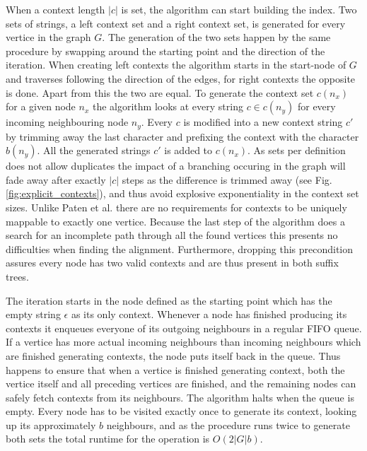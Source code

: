 \documentclass{article}
\begin{document}
When a context length $|c|$ is set, the algorithm can start building the index. Two sets of strings, a left context set and a right context set, is generated for every vertice in the graph $G$. The generation of the two sets happen by the same procedure by swapping around the starting point and the direction of the iteration. When creating left contexts the algorithm starts in the start-node of $G$ and traverses following the direction of the edges, for right contexts the opposite is done. Apart from this the two are equal. To generate the context set $c(n_x)$ for a given node $n_x$ the algorithm looks at every string $c \in c(n_y)$ for every incoming neighbouring node $n_y$. Every $c$ is modified into a new context string $c'$ by trimming away the last character and prefixing the context with the character $b(n_y)$. All the generated strings $c'$ is added to $c(n_x)$. As sets per definition does not allow duplicates the impact of a branching occuring in the graph will fade away after exactly $|c|$ steps as the difference is trimmed away (see Fig. \ref{fig:explicit_contexts}), and thus avoid explosive exponentiality in the context set sizes. Unlike Paten et al. \cite{mapping_to_a_reference_genome_structure} there are no requirements for contexts to be uniquely mappable to exactly one vertice. Because the last step of the algorithm does a search for an incomplete path through all the found vertices this presents no difficulties when finding the alignment. Furthermore, dropping this precondition assures every node has two valid contexts and are thus present in both suffix trees.\\
\par\noindent
The iteration starts in the node defined as the starting point which has the empty string $\epsilon$ as its only context. Whenever a node has finished producing its contexts it enqueues everyone of its outgoing neighbours in a regular FIFO queue. If a vertice has more actual incoming neighbours than incoming neighbours which are finished generating contexts, the node puts itself back in the queue. Thus happens to ensure that when a vertice is finished generating context, both the vertice itself and all preceding vertices are finished, and the remaining nodes can safely fetch contexts from its neighbours. The algorithm halts when the queue is empty. Every node has to be visited exactly once to generate its context, looking up its approximately $b$ neighbours, and as the procedure runs twice to generate both sets the total runtime for the operation is $O(2|G|b)$.\\
\end{document}
